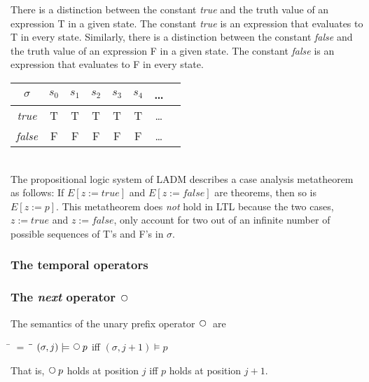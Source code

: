 \documentclass[12pt, fleqn, leqno]{article}
\newcommand{\lllgap}{12pt}                          %
\newcommand{\mymathindent}{24pt}                    %
\newcommand{\Next}{\;\,\text{\raisebox{3.5pt}{\circle{6}}}}
\newcommand{\myqedtab}{\hspace{384pt}}              %
\begin{document}
There is a distinction between the constant \textit{true} and the truth value of an expression T in a given state.
The constant \textit{true} is an expression that evaluates to T in every state.
Similarly, there is a distinction between the constant \textit{false} and the truth value of an expression F in a given state.
The constant \textit{false} is an expression that evaluates to F in every state.\\[\lllgap]
\begin{tabular}{c|ccccccc}
  $\sigma$         & $s_0$ & $s_1$ & $s_2$ & $s_3$ & $s_4$ & \dots \\
  \hline
  \textit{true}    & T     & T     & T     & T     & T     & \dots\\
  \textit{false}   & F     & F     & F     & F     & F     & \dots
\end{tabular}\\[\lllgap]

The propositional logic system of LADM \cite{LADM} describes a case analysis metatheorem as follows:
If $E[z:=\mathit{true}]$ and $E[z:=\mathit{false}]$ are theorems, then so is $E[z:=p]$.
This metatheorem does \textit{not} hold in LTL because the two cases, $z:=\mathit{true}$ and $z:=\mathit{false}$, only account for two out of an infinite number of possible sequences of T's and F's in $\sigma$.

\subsubsection{The temporal operators}

\subsubsection*{The \textit{next} operator $\Next$}

The semantics of the unary prefix operator $\Next$ are
\begin{tabbing}
\hspace{\mymathindent} \= $= \;$ \= \myqedtab \= \kill
  \> $(\sigma, j) \models \Next p$ \quad iff \quad $(\sigma, j+1) \models p$
\end{tabbing}
That is, $\Next p$ holds at position $j$ iff $p$ holds at position $j+1$.
\end{document}
